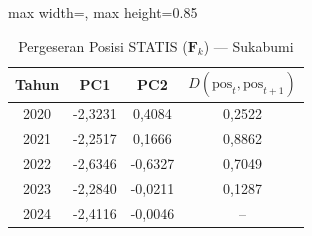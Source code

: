 \begin{table}[H]
\centering
\caption{Pergeseran Posisi STATIS ($\mathbf{F}_k$) --- Sukabumi} \label{tab:app2jarak_statis_skor_sukabumi}
\begin{adjustbox}{max width=\textwidth, max height=0.85\textheight}
\begin{tabular}{|c|c|c|c|}
\hline
\textbf{Tahun} & \textbf{PC1} & \textbf{PC2} & \textbf{$D(\text{pos}_t, \text{pos}_{t+1})$} \\
\hline
2020 & -2,3231 & 0,4084 & 0,2522 \\
2021 & -2,2517 & 0,1666 & 0,8862 \\
2022 & -2,6346 & -0,6327 & 0,7049 \\
2023 & -2,2840 & -0,0211 & 0,1287 \\
2024 & -2,4116 & -0,0046 & -- \\
\hline
\end{tabular}
\end{adjustbox}
\end{table}